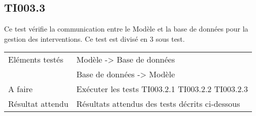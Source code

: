 
\subsection{TI003.3}
  		Ce test vérifie la communication entre le Modèle et la base de données pour la gestion des interventions. Ce test est divisé en 3 sous test.
  	
 
 	 \begin{center}
    	 	\begin{tabular}[h]{|p{}|p{}|}
		\hline
			Eléments testés & Modèle -> Base de données  \\
						    &  Base de données -> Modèle \\\hline
    			A faire & Exécuter les tests TI003.2.1 TI003.2.2 TI003.2.3 \\\hline
    			Résultat attendu & Résultats attendus des tests décrits ci-dessous \\\hline
     	\end{tabular}
  	\end{center}	
  	

  		




  		
  		

